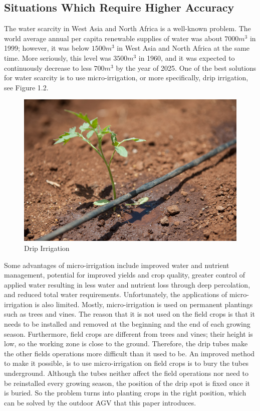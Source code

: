 \subsection{Situations Which Require Higher Accuracy}
The water scarcity in West Asia and North Africa is a well-known problem. The world average annual per capita renewable supplies of water was about $7000 m^{3}$ in 1999; however, it was below $1500 m^{3}$ in West Asia and North Africa at the same time. More seriously, this level was $3500 m^{3}$ in 1960, and it was expected to continuously decrease to less $700 m^{3}$ by the year of 2025. \cite{margat1999water} One of the best solutions for water scarcity is to use micro-irrigation, or more specifically, drip irrigation, see Figure 1.2. 
\begin{figure}[ht!]
\begin{center}
\includegraphics[scale = 0.2]{pics/drip.jpg}
\caption{Drip Irrigation}
\end{center}
\end{figure}
Some advantages of micro-irrigation include improved water and nutrient management, potential for improved yields and crop quality, greater control of applied water resulting in less water and nutrient loss through deep percolation, and reduced total water requirements. \cite{phene1986advantages} Unfortunately, the applications of micro-irrigation is also limited. Mostly, micro-irrigation is used on permanent plantings such as trees and vines. The reason that it is not used on the field crops is that it needs to be installed and removed at the beginning and the end of each growing season. Furthermore, field crops are different from trees and vines; their height is low, so the working zone is close to the ground. Therefore, the drip tubes make the other fields operations more difficult than it used to be. An improved method to make it possible, is to use micro-irrigation on field crops is to bury the tubes underground. \cite{camp1998subsurface} Although the tubes neither affect the field operations nor need to be reinstalled every growing season, the position of the drip spot is fixed once it is buried. So the problem turns into planting crops in the right position, which can be solved by the outdoor AGV that this paper introduces. 


